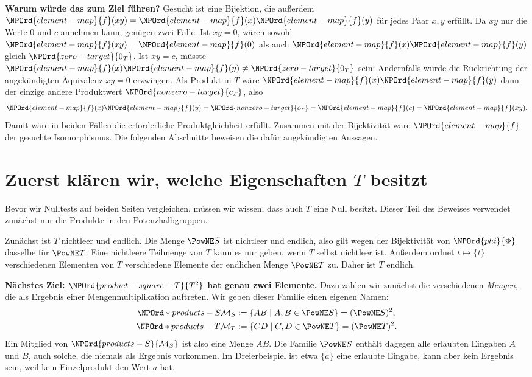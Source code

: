\medskip\noindent\textbf{Warum würde das zum Ziel führen?}
Gesucht ist eine Bijektion, die außerdem
\(\NPOrd{element-map}{f}(xy)=\NPOrd{element-map}{f}(x)\NPOrd{element-map}{f}(y)\) für jedes Paar \(x,y\) erfüllt.
Da \(xy\) nur die Werte \(0\) und \(c\) annehmen kann, genügen zwei Fälle.
Ist \(xy=0\), wären sowohl \(\NPOrd{element-map}{f}(xy)=\NPOrd{element-map}{f}(0)\) als auch \(\NPOrd{element-map}{f}(x)\NPOrd{element-map}{f}(y)\)
gleich \(\NPOrd{zero-target}{0_T}\). Ist \(xy=c\), müsste \(\NPOrd{element-map}{f}(x)\NPOrd{element-map}{f}(y)\ne\NPOrd{zero-target}{0_T}\) sein:
Andernfalls würde die Rückrichtung der angekündigten Äquivalenz
\(xy=0\) erzwingen. Als Produkt in \(T\) wäre \(\NPOrd{element-map}{f}(x)\NPOrd{element-map}{f}(y)\) dann
der einzige andere Produktwert \(\NPOrd{nonzero-target}{c_T}\), also
\[
 \NPOrd{element-map}{f}(x)\NPOrd{element-map}{f}(y)=\NPOrd{nonzero-target}{c_T}=\NPOrd{element-map}{f}(c)=\NPOrd{element-map}{f}(xy).
\]
Damit wäre in beiden Fällen die erforderliche Produktgleichheit
erfüllt. Zusammen mit der Bijektivität wäre \(\NPOrd{element-map}{f}\) der gesuchte
Isomorphismus. Die folgenden Abschnitte beweisen die dafür
angekündigten Aussagen.

\section*{Zuerst klären wir, welche Eigenschaften \(T\) besitzt}

Bevor wir Nulltests auf beiden Seiten vergleichen, müssen wir wissen,
dass auch \(T\) eine Null besitzt. Dieser Teil des Beweises verwendet
zunächst nur die Produkte in den Potenzhalbgruppen.

Zunächst ist \(T\) nichtleer und endlich. Die Menge \(\PowNE S\)
ist nichtleer und endlich, also gilt wegen der Bijektivität von \(\NPOrd{phi}{\Phi}\)
dasselbe für \(\PowNE T\). Eine nichtleere Teilmenge von \(T\) kann
es nur geben, wenn \(T\) selbst nichtleer ist. Außerdem ordnet
\(t\mapsto\{t\}\) verschiedenen Elementen von \(T\) verschiedene
Elemente der endlichen Menge \(\PowNE T\) zu. Daher ist \(T\) endlich.

\par{}
\medskip\noindent\textbf{Nächstes Ziel: \(\NPOrd{product-square-T}{T^2}\) hat genau zwei Elemente.}
Dazu zählen wir zunächst die verschiedenen \emph{Mengen}, die als
Ergebnis einer Mengenmultiplikation auftreten. Wir geben dieser
Familie einen eigenen Namen:
\[
 \begin{aligned}
 \NPOrd*{products-S}{\mathcal M_S}&:=\{AB\mid A,B\in\PowNE S\}=(\PowNE S)^2,\\
 \NPOrd*{products-T}{\mathcal M_T}&:=\{CD\mid C,D\in\PowNE T\}=(\PowNE T)^2.
 \end{aligned}
\]
Ein Mitglied von \(\NPOrd{products-S}{\mathcal M_S}\) ist also eine Menge \(AB\).
Die Familie \(\PowNE S\) enthält dagegen alle erlaubten Eingaben
\(A\) und \(B\), auch solche, die niemals als Ergebnis vorkommen.
Im Dreierbeispiel ist etwa \(\{a\}\) eine erlaubte Eingabe, kann aber
kein Ergebnis sein, weil kein Einzelprodukt den Wert \(a\) hat.

